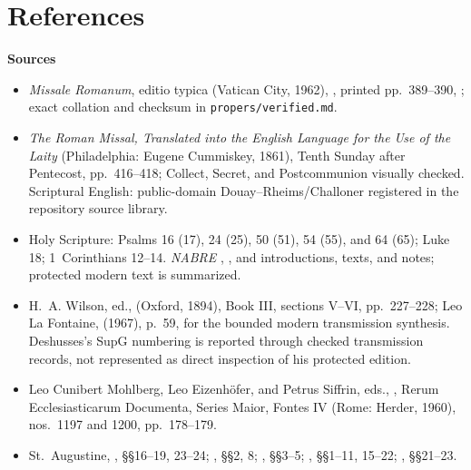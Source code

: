 \section*{References}

\textbf{Sources}
{\fontsize{7.05}{7.35}\selectfont
\begin{itemize}[itemsep=0em,topsep=0.15em,parsep=0pt]
\item \emph{Missale Romanum}, editio typica (Vatican City, 1962), , printed pp.~389--390, ; exact collation and checksum in \texttt{propers/verified.md}.
\item \emph{The Roman Missal, Translated into the English Language for the Use of the Laity} (Philadelphia: Eugene Cummiskey, 1861), Tenth Sunday after Pentecost, pp.~416--418; Collect, Secret, and Postcommunion visually checked. Scriptural English: public-domain Douay--Rheims/Challoner registered in the repository source library.
\item Holy Scripture: Psalms 16 (17), 24 (25), 50 (51), 54 (55), and 64 (65); Luke 18; 1~Corinthians 12--14. \emph{NABRE} , , and  introductions, texts, and notes; protected modern text is summarized.
\ifdefined\TriptychSynthesisEdition\else
\item H.~A. Wilson, ed.,  (Oxford, 1894), Book III, sections V--VI, pp.~227--228; Leo La Fontaine,  (1967), p.~59, for the bounded modern transmission synthesis. Deshusses's SupG numbering is reported through checked transmission records, not represented as direct inspection of his protected edition.
\fi
\ifdefined\TriptychSynthesisEdition\else
\item Leo Cunibert Mohlberg, Leo Eizenhöfer, and Petrus Siffrin, eds., , Rerum Ecclesiasticarum Documenta, Series Maior, Fontes IV (Rome: Herder, 1960), nos.~1197 and 1200, pp.~178--179.
\fi
\item St.~Augustine, , §§16--19, 23--24; , §§2, 8; , §§3--5; , §§1--11, 15--22; , §§21--23.

\end{itemize}}
